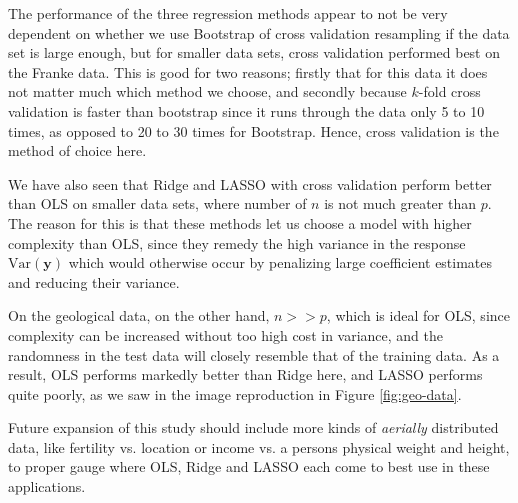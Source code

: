 \documentclass[]{article}
\begin{document}
The performance of the three regression methods appear to not be very dependent on whether we use Bootstrap of cross validation resampling if the data set is large enough, but for smaller data sets, cross validation performed best on the Franke data. This is good for two reasons; firstly that for this data it does not matter much which method we choose, and secondly because $k$-fold cross validation is faster than bootstrap since it runs through the data only 5 to 10 times, as opposed to 20 to 30 times for Bootstrap. Hence, cross validation is the method of choice here.

We have also seen that Ridge and LASSO with cross validation perform better than OLS on smaller data sets, where number of $n$ is not much greater than $p$. The reason for this is that these methods let us choose a model with higher complexity than OLS, since they remedy the high variance in the response $\mathrm{Var}(\mathbf{y})$ which would otherwise occur by penalizing large coefficient estimates and reducing their variance.

On the geological data, on the other hand, $n >> p$, which is ideal for OLS, since complexity can be increased without too high cost in variance, and the randomness in the test data will closely resemble that of the training data. As a result, OLS performs markedly better than Ridge here, and LASSO performs quite poorly, as we saw in the image reproduction in Figure \ref{fig:geo-data}.

Future expansion of this study should include more kinds of \textit{aerially} distributed data, like fertility vs. location or income vs. a persons physical weight and height, to proper gauge where OLS, Ridge and LASSO each come to best use in these applications.

\clearpage


\end{document}
